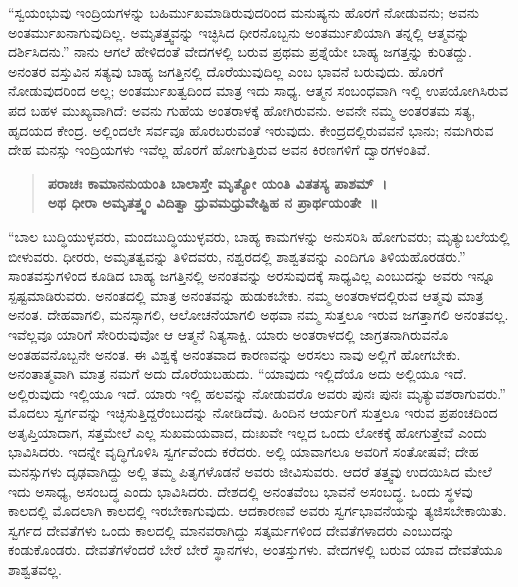 “ಸ್ವಯಂಭುವು ಇಂದ್ರಿಯಗಳನ್ನು ಬಹಿರ್ಮುಖಮಾಡಿರುವುದರಿಂದ ಮನುಷ್ಯನು ಹೊರಗೆ ನೋಡುವನು; ಅವನು ಅಂತರ್ಮುಖನಾಗುವುದಿಲ್ಲ. ಅಮೃತತ್ತ್ವವನ್ನು ಇಚ್ಛಿಸಿದ ಧೀರನೊಬ್ಬನು ಅಂತರ್ಮುಖಿಯಾಗಿ ತನ್ನಲ್ಲಿ ಆತ್ಮವನ್ನು ದರ್ಶಿಸಿದನು.” ನಾನು ಆಗಲೆ ಹೇಳಿದಂತೆ ವೇದಗಳಲ್ಲಿ ಬರುವ ಪ್ರಥಮ ಪ್ರಶ್ನೆಯೇ ಬಾಹ್ಯ ಜಗತ್ತನ್ನು ಕುರಿತದ್ದು. ಅನಂತರ ವಸ್ತುವಿನ ಸತ್ಯವು ಬಾಹ್ಯ ಜಗತ್ತಿನಲ್ಲಿ ದೊರೆಯುವುದಿಲ್ಲ ಎಂಬ ಭಾವನೆ ಬರುವುದು. ಹೊರಗೆ ನೋಡುವುದರಿಂದ ಅಲ್ಲ; ಅಂತರ್ಮುಖತ್ವದಿಂದ ಮಾತ್ರ ಇದು ಸಾಧ್ಯ. ಆತ್ಮನ ಸಂಬಂಧವಾಗಿ ಇಲ್ಲಿ ಉಪಯೋಗಿಸಿರುವ ಪದ ಬಹಳ ಮುಖ್ಯವಾಗಿದೆ: ಅವನು ಗುಹೆಯ ಅಂತರಾಳಕ್ಕೆ ಹೋಗಿರುವನು. ಅವನೇ ನಮ್ಮ ಅಂತರತಮ ಸತ್ಯ, ಹೃದಯದ ಕೇಂದ್ರ. ಅಲ್ಲಿಂದಲೇ ಸರ್ವವೂ ಹೊರಬರುವಂತೆ ಇರುವುದು. ಕೇಂದ್ರದಲ್ಲಿರುವವನೆ ಭಾನು; ನಮಗಿರುವ ದೇಹ ಮನಸ್ಸು ಇಂದ್ರಿಯಗಳು ಇವೆಲ್ಲ ಹೊರಗೆ ಹೋಗುತ್ತಿರುವ ಅವನ ಕಿರಣಗಳಿಗೆ ದ್ವಾರಗಳಂತಿವೆ.

\vspace{-0.2cm}

\begin{verse}
\textbf{ಪರಾಚಃ ಕಾಮಾನನುಯಂತಿ ಬಾಲಾಸ್ತೇ ಮೃತ್ಯೋ ಯಂತಿ ವಿತತಸ್ಯ ಪಾಶಮ್​~।\\ಅಥ ಧೀರಾ ಅಮೃತತ್ತ್ವಂ ವಿದಿತ್ವಾ ಧ್ರುವಮಧ್ರುವೇಷ್ಟಿಹ ನ ಪ್ರಾರ್ಥಯಂತೇ~॥}
\end{verse}

\vspace{-0.2cm}

“ಬಾಲ ಬುದ್ಧಿಯುಳ್ಳವರು, ಮಂದಬುದ್ಧಿಯುಳ್ಳವರು, ಬಾಹ್ಯ ಕಾಮಗಳನ್ನು ಅನುಸರಿಸಿ ಹೋಗುವರು; ಮೃತ್ಯುಬಲೆಯಲ್ಲಿ ಬೀಳುವರು. ಧೀರರು, ಅಮೃತತ್ವವನ್ನು ತಿಳಿದವರು, ನಶ್ವರದಲ್ಲಿ ಶಾಶ್ವತವನ್ನು ಎಂದಿಗೂ ತಿಳಿಯಹೊರಡರು.” ಸಾಂತವಸ್ತುಗಳಿಂದ ಕೂಡಿದ ಬಾಹ್ಯ ಜಗತ್ತಿನಲ್ಲಿ ಅನಂತವನ್ನು ಅರಸುವುದಕ್ಕೆ ಸಾಧ್ಯವಿಲ್ಲ ಎಂಬುದನ್ನು ಅವರು ಇನ್ನೂ ಸ್ಪಷ್ಟಮಾಡಿರುವರು. ಅನಂತದಲ್ಲಿ ಮಾತ್ರ ಅನಂತವನ್ನು ಹುಡುಕಬೇಕು. ನಮ್ಮ ಅಂತರಾಳದಲ್ಲಿರುವ ಆತ್ಮವು ಮಾತ್ರ ಅನಂತ. ದೇಹವಾಗಲಿ, ಮನಸ್ಸಾಗಲಿ, ಆಲೋಚನೆಯಾಗಲಿ ಅಥವಾ ನಮ್ಮ ಸುತ್ತಲೂ ಇರುವ ಜಗತ್ತಾಗಲಿ ಅನಂತವಲ್ಲ. ಇವೆಲ್ಲವೂ ಯಾರಿಗೆ ಸೇರಿರುವುವೋ ಆ ಆತ್ಮನೆ ನಿತ್ಯಸಾಕ್ಷಿ. ಯಾರು ಅಂತರಾಳದಲ್ಲಿ ಜಾಗ್ರತನಾಗಿರುವನೊ ಅಂತಹವನೊಬ್ಬನೇ ಅನಂತ. ಈ ವಿಶ್ವಕ್ಕೆ ಅನಂತವಾದ ಕಾರಣವನ್ನು ಅರಸಲು ನಾವು ಅಲ್ಲಿಗೆ ಹೋಗಬೇಕು. ಅನಂತಾತ್ಮವಾಗಿ ಮಾತ್ರ ನಮಗೆ ಅದು ದೊರೆಯಬಹುದು. “ಯಾವುದು ಇಲ್ಲಿದೆಯೊ ಅದು ಅಲ್ಲಿಯೂ ಇದೆ. ಅಲ್ಲಿರುವುದು ಇಲ್ಲಿಯೂ ಇದೆ. ಯಾರು ಇಲ್ಲಿ ಹಲವನ್ನು ನೋಡುವರೊ ಅವರು ಪುನಃ ಪುನಃ ಮೃತ್ಯುವಶರಾಗುವರು.” ಮೊದಲು ಸ್ವರ್ಗವನ್ನು ಇಚ್ಛಿಸುತ್ತಿದ್ದರೆಂಬುದನ್ನು ನೋಡಿದೆವು. ಹಿಂದಿನ ಆರ್ಯರಿಗೆ ಸುತ್ತಲೂ ಇರುವ ಪ್ರಪಂಚದಿಂದ ಅತೃಪ್ತಿಯಾದಾಗ, ಸತ್ತಮೇಲೆ ಎಲ್ಲ ಸುಖಮಯವಾದ, ದುಃಖವೇ ಇಲ್ಲದ ಒಂದು ಲೋಕಕ್ಕೆ ಹೋಗುತ್ತೇವೆ ಎಂದು ಭಾವಿಸಿದರು. ಇದನ್ನೇ ವೃದ್ಧಿಗೊಳಿಸಿ ಸ್ವರ್ಗವೆಂದು ಕರೆದರು. ಅಲ್ಲಿ ಯಾವಾಗಲೂ ಅವರಿಗೆ ಸಂತೋಷವೆ; ದೇಹ ಮನಸ್ಸುಗಳು ದೃಢವಾಗಿದ್ದು ಅಲ್ಲಿ ತಮ್ಮ ಪಿತೃಗಳೊಡನೆ ಅವರು ಜೀವಿಸುವರು. ಆದರೆ ತತ್ತ್ವವು ಉದಯಿಸಿದ ಮೇಲೆ ಇದು ಅಸಾಧ್ಯ, ಅಸಂಬದ್ಧ ಎಂದು ಭಾವಿಸಿದರು. ದೇಶದಲ್ಲಿ ಅನಂತವೆಂಬ ಭಾವನೆ ಅಸಂಬದ್ಧ. ಒಂದು ಸ್ಥಳವು ಕಾಲದಲ್ಲಿ ಮೊದಲಾಗಿ ಕಾಲದಲ್ಲಿ ಇರಬೇಕಾಗುವುದು. ಆದಕಾರಣವೆ ಅವರು ಸ್ವರ್ಗಭಾವನೆಯನ್ನು ತ್ಯಜಿಸಬೇಕಾಯಿತು. ಸ್ವರ್ಗದ ದೇವತೆಗಳು ಒಂದು ಕಾಲದಲ್ಲಿ ಮಾನವರಾಗಿದ್ದು ಸತ್ಕರ್ಮಗಳಿಂದ ದೇವತೆಗಳಾದರು ಎಂಬುದನ್ನು ಕಂಡುಕೊಂಡರು. ದೇವತೆಗಳೆಂದರೆ ಬೇರೆ ಬೇರೆ ಸ್ಥಾನಗಳು, ಅಂತಸ್ತುಗಳು. ವೇದಗಳಲ್ಲಿ ಬರುವ ಯಾವ ದೇವತೆಯೂ ಶಾಶ್ವತವಲ್ಲ.


